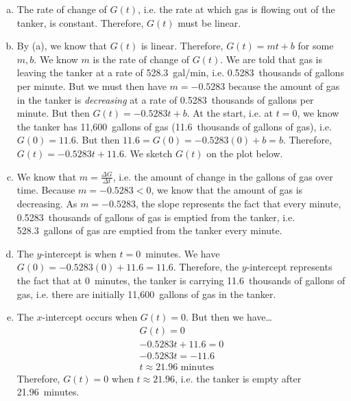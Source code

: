 \documentclass[11pt,letterpaper]{article}
\begin{document}
{\small\itshape
\sol 
\begin{enumerate}[(a)]
\item The rate of change of $G(t)$, i.e. the rate at which gas is flowing out of the tanker, is constant. Therefore, $G(t)$ must be linear. \pspace

\item By (a), we know that $G(t)$ is linear. Therefore, $G(t)= mt + b$ for some $m, b$. We know $m$ is the rate of change of $G(t)$. We are told that gas is leaving the tanker at a rate of 528.3~gal/min, i.e. 0.5283~thousands of gallons per minute. But we must then have $m= -0.5283$ because the amount of gas in the tanker is \textit{decreasing} at a rate of 0.5283~thousands of gallons per minute. But then $G(t)= -0.5283t + b$. At the start, i.e. at $t= 0$, we know the tanker has 11,600~gallons of gas (11.6~thousands of gallons of gas), i.e. $G(0)= 11.6$. But then $11.6= G(0)= -0.5283(0) + b= b$. Therefore, $G(t)= -0.5283t + 11.6$. We sketch $G(t)$ on the plot below. \pspace

\item We know that $m= \frac{\Delta G}{\Delta t}$, i.e. the amount of change in the gallons of gas over time. Because $m= -0.5283 < 0$, we know that the amount of gas is decreasing. As $m= -0.5283$, the slope represents the fact that every minute, 0.5283~thousands of gallons of gas is emptied from the tanker, i.e. 528.3~gallons of gas are emptied from the tanker every minute. \pspace

\item The $y$-intercept is when $t= 0$~minutes. We have $G(0)= -0.5283(0) + 11.6= 11.6$. Therefore, the $y$-intercept represents the fact that at 0~minutes, the tanker is carrying 11.6~thousands of gallons of gas, i.e. there are initially 11,600~gallons of gas in the tanker. \pspace

\item The $x$-intercept occurs when $G(t)= 0$. But then we have\dots
	\[
	\begin{gathered}
	G(t)= 0 \\
	-0.5283t + 11.6= 0 \\
	-0.5283t= -11.6 \\
	t\approx 21.96 \text{ minutes}
	\end{gathered}
	\]
Therefore, $G(t)= 0$ when $t \approx 21.96$, i.e. the tanker is empty after 21.96~minutes. 
\end{enumerate}
}



	\hfill
	
\end{document}
